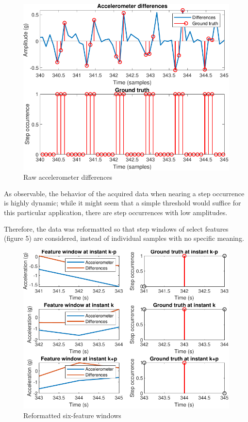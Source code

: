 \documentclass[conference]{IEEEtran}
\begin{document}
\begin{figure}[H]
\centering
\includegraphics[scale=0.6]{Figure2.pdf}
\caption{Raw accelerometer differences}
\label{fig:rawdif}
\end{figure}

As observable, the behavior of the acquired data when nearing a step occurrence is highly dynamic; while it might seem that a simple threshold would suffice for this particular application, there are step occurrences with low amplitudes.
\par Therefore, the data was reformatted so that step windows of select features (figure 5) are considered, instead of individual samples with no specific meaning.\par
\begin{figure}[h]
\centering
\includegraphics[scale=0.6]{Figure3.pdf}
\caption{Reformatted six-feature windows}
\label{fig:wind}
\end{figure}
\end{document}
